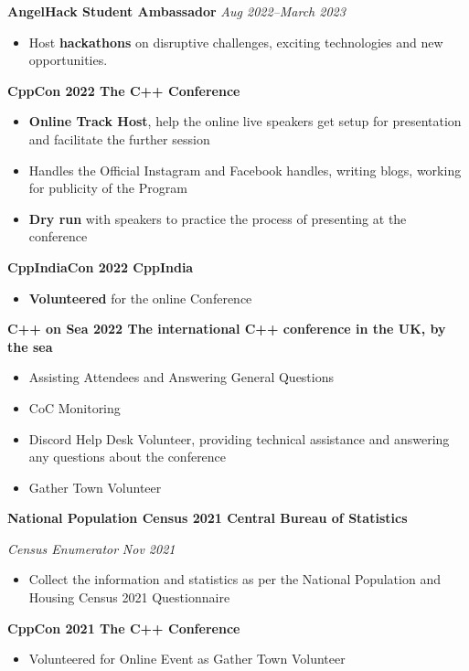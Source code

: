 {\textbf{AngelHack Student Ambassador} \hfill \textit{Aug 2022--March 2023}}\par
\begin{itemize}
	\item Host \textbf{hackathons} on disruptive challenges, exciting technologies and new opportunities.
\end{itemize}\par

\textbf{CppCon 2022 \hfill The C++ Conference}\par
\begin{itemize}
	\item \textbf{Online Track Host}, help the online live speakers get setup for presentation and facilitate the further session
    \item Handles the Official Instagram and Facebook handles, writing blogs, working for publicity of the Program
	\item \textbf{Dry run} with speakers to practice the process of presenting at the conference
\end{itemize}\par

\textbf{CppIndiaCon 2022 \hfill CppIndia}\par
\begin{itemize}
	\item \textbf{Volunteered} for the online Conference
\end{itemize}\par

\textbf{C++ on Sea 2022 \hfill The international C++ conference in the UK, by the sea}\par
\begin{itemize}
	\item Assisting Attendees and Answering General Questions
	\item CoC Monitoring
	\item Discord Help Desk Volunteer, providing technical assistance and answering any questions about the conference
	\item Gather Town Volunteer
\end{itemize}\par

\textbf{National Population Census 2021 \hfill Central Bureau of Statistics} \par
\textit{Census Enumerator}  \hfill \textit{Nov 2021}
\begin{itemize}
	\item Collect the information and statistics as per the National Population and Housing Census 2021 Questionnaire
\end{itemize}\par

\textbf{CppCon 2021 \hfill The C++ Conference}\par
\begin{itemize}
	\item Volunteered for Online Event as Gather Town Volunteer
\end{itemize}\par